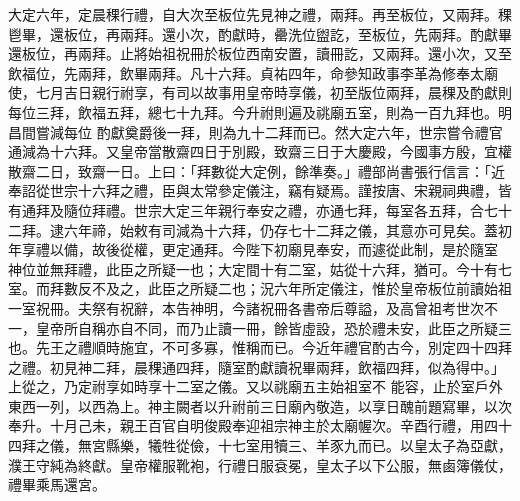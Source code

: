 \begin{pinyinscope}
 大定六年，定晨稞行禮，自大次至板位先見神之禮，兩拜。再至板位，又兩拜。稞鬯畢，還板位，再兩拜。還小次，酌獻時，罍洗位盥訖，至板位，先兩拜。酌獻畢還板位，再兩拜。止將始祖祝冊於板位西南安置，讀冊訖，又兩拜。還小次，又至飲福位，先兩拜，飲畢兩拜。凡十六拜。貞祐四年，命參知政事李革為修奉太廟使，七月吉日親行祔享，有司以故事用皇帝時享儀，初至版位兩拜，晨稞及酌獻則每位三拜，飲福五拜，總七十九拜。今升祔則遍及祧廟五室，則為一百九拜也。明昌間嘗減每位
 酌獻奠爵後一拜，則為九十二拜而已。然大定六年，世宗嘗令禮官通減為十六拜。又皇帝當散齋四日于別殿，致齋三日于大慶殿，今國事方殷，宜權散齋二日，致齋一日。上曰：「拜數從大定例，餘準奏。」禮部尚書張行信言：「近奉詔從世宗十六拜之禮，臣與太常參定儀注，竊有疑焉。謹按唐、宋親祠典禮，皆有通拜及隨位拜禮。世宗大定三年親行奉安之禮，亦通七拜，每室各五拜，合七十二拜。逮六年禘，始敕有司減為十六拜，仍存七十二拜之儀，其意亦可見矣。蓋初年享禮以備，故後從權，更定通拜。今陛下初廟見奉安，而遽從此制，是於隨室
 神位並無拜禮，此臣之所疑一也；大定間十有二室，姑從十六拜，猶可。今十有七室。而拜數反不及之，此臣之所疑二也；況六年所定儀注，惟於皇帝板位前讀始祖一室祝冊。夫祭有祝辭，本告神明，今諸祝冊各書帝后尊謚，及高曾祖考世次不一，皇帝所自稱亦自不同，而乃止讀一冊，餘皆虛設，恐於禮未安，此臣之所疑三也。先王之禮順時施宜，不可多寡，惟稱而已。今近年禮官酌古今，別定四十四拜之禮。初見神二拜，晨稞通四拜，隨室酌獻讀祝畢兩拜，飲福四拜，似為得中。」上從之，乃定祔享如時享十二室之儀。又以祧廟五主始祖室不
 能容，止於室戶外東西一列，以西為上。神主闕者以升祔前三日廟內敬造，以享日醜前題寫畢，以次奉升。十月己未，親王百官自明俊殿奉迎祖宗神主於太廟幄次。辛酉行禮，用四十四拜之儀，無宮縣樂，犧牲從儉，十七室用犢三、羊豕九而已。以皇太子為亞獻，濮王守純為終獻。皇帝權服靴袍，行禮日服袞冕，皇太子以下公服，無鹵簿儀仗，禮畢乘馬還宮。



\end{pinyinscope}